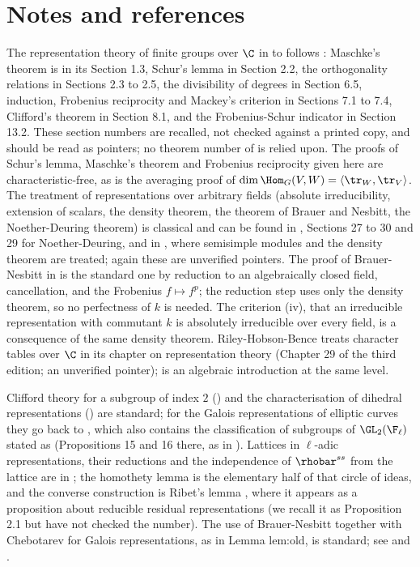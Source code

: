\section{Notes and references}\label{sec:reps:notes}

The representation theory of finite groups over $\C$ in  to  follows \cite{SerreLinearReps}: Maschke's
theorem is in its Section 1.3, Schur's lemma in Section 2.2, the orthogonality relations in Sections 2.3 to 2.5, the divisibility of
degrees in Section 6.5, induction, Frobenius reciprocity and Mackey's criterion in Sections 7.1 to 7.4, Clifford's theorem in Section 8.1,
and the Frobenius-Schur indicator in Section 13.2. These section numbers are recalled, not checked against a printed copy, and should be
read as pointers; no theorem number of \cite{SerreLinearReps} is relied upon. The proofs of Schur's lemma, Maschke's theorem and
Frobenius reciprocity given here are characteristic-free, as is the averaging proof of $\dim\Hom_G(V,W)=\langle\tr_W,\tr_V\rangle$. The treatment of
representations over arbitrary fields (absolute irreducibility, extension of scalars, the density theorem, the theorem of Brauer and
Nesbitt, the Noether-Deuring theorem) is classical and can be found in \cite{CurtisReiner}, Sections 27 to 30 and 29 for Noether-Deuring,
and in \cite[Chapter XVII]{Lang}, where semisimple modules and the density theorem are treated; again these are unverified pointers.
The proof of Brauer-Nesbitt in  is the standard one by reduction to an algebraically closed field, cancellation, and
the Frobenius $f\mapsto f^p$; the reduction step uses only the density theorem, so no perfectness of $k$ is needed. The criterion
(iv), that an irreducible representation with commutant $k$ is absolutely irreducible over every field, is a
consequence of the same density theorem. Riley-Hobson-Bence \cite{RHB06} treats character tables over $\C$ in its chapter on representation
theory (Chapter 29 of the third edition; an unverified pointer); \cite[Chapter 18]{DummitFoote} is an algebraic introduction at the
same level.

Clifford theory for a subgroup of index $2$ () and the characterisation of dihedral representations
() are standard; for the Galois representations of elliptic curves they go back to \cite[Section 2]{Serre72}, which
also contains the classification of subgroups of $\GL_2(\F_\ell)$ stated as  (Propositions 15 and 16 there, as in
). Lattices in $\ell$-adic representations, their reductions and the independence of $\rhobar^{ss}$ from the lattice are in
\cite[Chapter I]{SerreAbelian}; the homothety lemma  is the elementary half of that circle of ideas, and the converse
construction is Ribet's lemma \cite[Section 2]{Ribet76}, where it appears as a proposition about reducible residual representations (we recall
it as Proposition 2.1 but have not checked the number). The use of Brauer-Nesbitt together with Chebotarev for Galois representations,
as in Lemma lem:old, is standard; see \cite{DDT} and .

